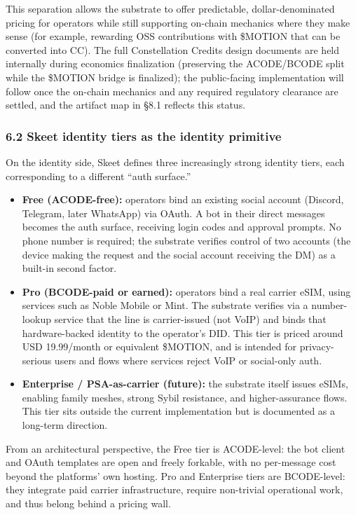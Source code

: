 This separation allows the substrate to offer predictable,
dollar-denominated pricing for operators while still supporting on-chain
mechanics where they make sense (for example, rewarding OSS
contributions with \$MOTION that can be converted into CC). The full
Constellation Credits design documents are held internally during
economics finalization (preserving the ACODE/BCODE split while the
\$MOTION bridge is finalized); the public-facing implementation will
follow once the on-chain mechanics and any required regulatory clearance
are settled, and the artifact map in §8.1 reflects this status.

\subsubsection{6.2 Skeet identity tiers as the identity
primitive}\label{skeet-identity-tiers-as-the-identity-primitive}

On the identity side, Skeet defines three increasingly strong identity
tiers, each corresponding to a different ``auth surface.''

\begin{itemize}
\tightlist
\item
  \textbf{Free (ACODE-free):} operators bind an existing social account
  (Discord, Telegram, later WhatsApp) via OAuth. A bot in their direct
  messages becomes the auth surface, receiving login codes and approval
  prompts. No phone number is required; the substrate verifies control
  of two accounts (the device making the request and the social account
  receiving the DM) as a built-in second factor.
\item
  \textbf{Pro (BCODE-paid or earned):} operators bind a real carrier
  eSIM, using services such as Noble Mobile or Mint. The substrate
  verifies via a number-lookup service that the line is carrier-issued
  (not VoIP) and binds that hardware-backed identity to the operator's
  DID. This tier is priced around USD 19.99/month or equivalent
  \$MOTION, and is intended for privacy-serious users and flows where
  services reject VoIP or social-only auth.
\item
  \textbf{Enterprise / PSA-as-carrier (future):} the substrate itself
  issues eSIMs, enabling family meshes, strong Sybil resistance, and
  higher-assurance flows. This tier sits outside the current
  implementation but is documented as a long-term direction.
\end{itemize}

From an architectural perspective, the Free tier is ACODE-level: the bot
client and OAuth templates are open and freely forkable, with no
per-message cost beyond the platforms' own hosting. Pro and Enterprise
tiers are BCODE-level: they integrate paid carrier infrastructure,
require non-trivial operational work, and thus belong behind a pricing
wall.

